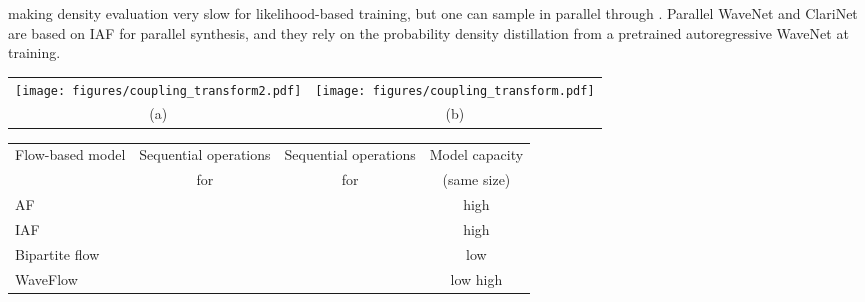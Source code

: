 \documentclass{article}
\begin{document}
making density evaluation very slow for likelihood-based training, but one can sample  in parallel through
.
Parallel WaveNet \citep{oord2017parallel} and ClariNet~\citep{ping2018clarinet} are based on IAF for parallel synthesis, and they rely on the probability density distillation from a pretrained autoregressive WaveNet at training. 



\begin{figure*}[t] \centering
\begin{tabular}{cc}
\hspace{-.4cm}
\texttt{[image: figures/coupling\_transform2.pdf]} 
&
\hspace{1.3cm}
\texttt{[image: figures/coupling\_transform.pdf]} 
\\
\vspace{-.7em}
{\hspace{-.5em} \small (a)}  & \hspace{1.2cm} {\small(b)}
\\
\end{tabular}
\vspace{-.8em}
\caption{The Jacobian  of (a) an autoregressive transformation, and (b) a bipartite transformation.
The blank cells are zeros and represent the independent relations between  and .
The light-blue cells with scaling variables  represent the linear dependencies.
The dark-blue cells represent complex non-linear dependencies.}
\vspace{-.7em}
\label{fig:Jacobian} \end{figure*}
\begin{table*}[t!]
\centering
\vspace{-.3em}
\caption{The minimum number of sequential operations~(indicates parallelism) required by flow-based models for density evaluation  and sampling . Therein,  is the length of ,  is the squeezed height in WaveFlow. In WaveFlow, larger  leads to higher model capacity, but more sequential steps for sampling.}
\vspace{0.2em}
\begin{tabular}{l|c|c|c}
\hline 
\multirow{2}{8.5em}{Flow-based model}  &  Sequential operations & Sequential operations & Model capacity \\
& for  & for  & (same size)
\\ \hline
AF &  &  & high  \\ 
IAF  &  &  & high \\ 
Bipartite flow  &  &  & low  \\
WaveFlow &  &  & low  high \\ 
\hline
\end{tabular}
\label{tab:summary_flow}
\end{table*}
\end{document}
